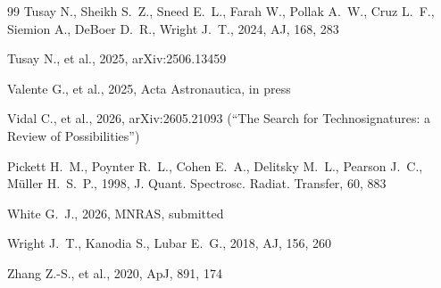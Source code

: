 \documentclass{openjournal}
\begin{document}
\begin{thebibliography}{99}
 Tusay N., Sheikh S.~Z., Sneed E.~L., Farah W., Pollak A.~W., Cruz L.~F., Siemion A., DeBoer D.~R., Wright J.~T., 2024, AJ, 168, 283

 Tusay N., et al., 2025, arXiv:2506.13459

 Valente G., et al., 2025, Acta Astronautica, in press

 Vidal C., et al., 2026, arXiv:2605.21093 (``The Search for Technosignatures: a Review of Possibilities'')


 Pickett H.~M., Poynter R.~L., Cohen E.~A., Delitsky M.~L., Pearson J.~C., M\"uller H.~S.~P., 1998, J. Quant. Spectrosc. Radiat. Transfer, 60, 883

 White G.~J., 2026, MNRAS, submitted

 Wright J.~T., Kanodia S., Lubar E.~G., 2018, AJ, 156, 260

 Zhang Z.-S., et al., 2020, ApJ, 891, 174

\end{thebibliography}
\end{document}
